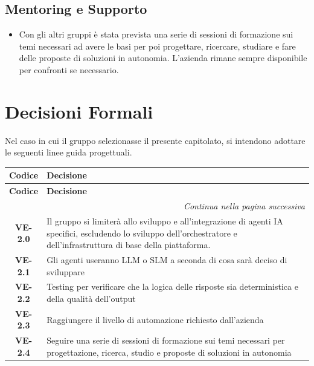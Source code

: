 \subsection{Mentoring e Supporto}
\begin{itemize}
	\item Con gli altri gruppi è stata prevista una serie di sessioni di formazione sui temi necessari ad avere le basi per poi progettare, ricercare, studiare e fare delle proposte di soluzioni in autonomia. L'azienda rimane sempre disponibile per confronti se necessario.
\end{itemize}

\section{Decisioni Formali}
Nel caso in cui il gruppo selezionasse il presente capitolato, si intendono adottare le seguenti linee guida progettuali.

\renewcommand{\arraystretch}{1.3}
\vspace{-0.3cm}
\noindent
\begin{longtable}{c p{12cm}}
    \toprule
    \textbf{Codice} & \textbf{Decisione} \\
    \midrule
    \endfirsthead

    \toprule
    \textbf{Codice} & \textbf{Decisione} \\
    \midrule
    \endhead

    \midrule
    \multicolumn{2}{r}{\textit{Continua nella pagina successiva}} \\
    \midrule
    \endfoot

    \bottomrule
    \endlastfoot

	\textbf{VE-2.0} & Il gruppo si limiterà allo sviluppo e all'integrazione di agenti IA specifici, escludendo lo sviluppo dell'orchestratore e dell'infrastruttura di base della piattaforma. \\
    \textbf{VE-2.1} & Gli agenti useranno LLM o SLM a seconda di cosa sarà deciso di sviluppare \\
    \textbf{VE-2.2} & Testing per verificare che la logica delle risposte sia deterministica e della qualità dell'output \\
    \textbf{VE-2.3} & Raggiungere il livello di automazione richiesto dall'azienda \\
    \textbf{VE-2.4} & Seguire una serie di sessioni di formazione sui temi necessari per progettazione, ricerca, studio e proposte di soluzioni in autonomia \\
\end{longtable}


